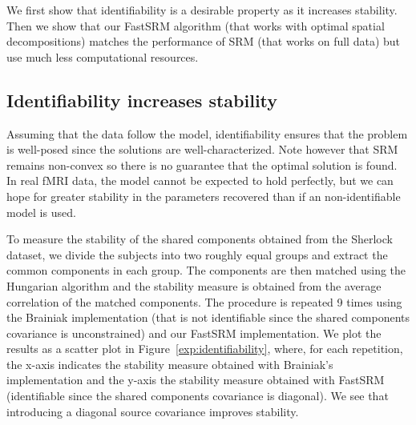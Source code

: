 \documentclass{article}
\newcommand{\bt}[1]{\todo[color=orange, inline=True]{BT: #1}}
\begin{document}
We first show that identifiability is a desirable property as it increases
stability.
%
Then we show that our FastSRM algorithm (that works with optimal spatial decompositions)
matches the performance of SRM (that works on full data) but use much less
computational resources.
%


\subsection{Identifiability increases stability}
Assuming that the data follow the model, identifiability ensures that the
problem is well-posed since the solutions are well-characterized. Note however that SRM
remains non-convex so there is no guarantee that the optimal solution is found.
%
%
In real fMRI data, the model cannot be expected to hold perfectly, but we can
hope for greater stability in the parameters recovered than if an non-identifiable
model is used.


To measure the stability of the shared components obtained from the Sherlock
dataset, we divide the subjects into two roughly equal groups and extract the
common components in each group.
%
The components are then matched using the Hungarian algorithm and the stability
measure is obtained from the average correlation of the matched components.
%
The procedure is repeated 9 times using the Brainiak implementation (that is not
identifiable since the shared components covariance is unconstrained) and our
FastSRM implementation.
%
We plot the results as a scatter plot in
Figure~\ref{exp:identifiability}, where, for each repetition, the
x-axis indicates the stability measure obtained with Brainiak's
implementation and the y-axis the stability measure obtained with
FastSRM (identifiable since the shared components covariance is
diagonal).
%
We see that introducing a diagonal source covariance improves stability.
%
\end{document}
